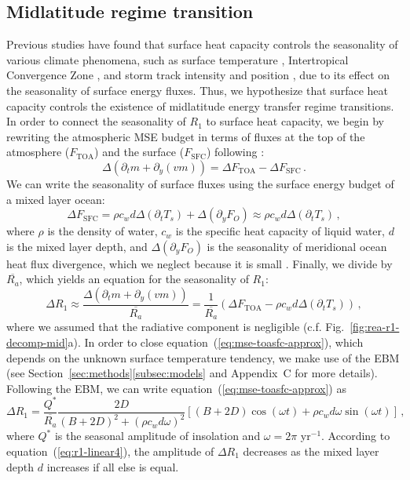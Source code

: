 \documentclass{ametsocV5}
\begin{document}
  \subsection{Midlatitude regime transition} \label{subsec:mld}
  Previous studies have found that surface heat capacity controls the seasonality of various climate phenomena, such as surface temperature \citep{donohoe2014}, Intertropical Convergence Zone \citep{bordoni2008}, and storm track intensity and position \citep{barpanda2020}, due to its effect on the seasonality of surface energy fluxes. Thus, we hypothesize that surface heat capacity controls the existence of midlatitude energy transfer regime transitions. In order to connect the seasonality of $R_1$ to surface heat capacity, we begin by rewriting the atmospheric MSE budget in terms of fluxes at the top of the atmosphere ($F_\mathrm{TOA}$) and the surface ($F_\mathrm{SFC}$) following \cite{barpanda2020}:
  \begin{equation}\label{eq:mse-toasfc}
    \Delta\left(\partial_t m + \partial_y (vm) \right) = \Delta F_{\mathrm{TOA}} - \Delta F_{\mathrm{SFC}} \, .
  \end{equation}
  We can write the seasonality of surface fluxes using the surface energy budget of a mixed layer ocean:
  \begin{equation}
    \Delta F_{\mathrm{SFC}} = \rho c_{w} d \Delta\left(\partial_t T_{s}\right) + \Delta ( \partial_y F_{O}) \approx \rho c_{w} d \Delta\left(\partial_t T_{s}\right) \, ,
  \end{equation}
  where $\rho$ is the density of water, $c_w$ is the specific heat capacity of liquid water, $d$ is the mixed layer depth, and $\Delta(\partial_y F_O)$ is the seasonality of meridional ocean heat flux divergence, which we neglect because it is small \citep{roberts2017}. Finally, we divide by $\overline{R_a}$, which yields an equation for the seasonality of $R_1$:
  \begin{equation}\label{eq:mse-toasfc-approx}
    \Delta R_1 \approx \frac{\Delta\left(\partial_t m + \partial_y (vm) \right)}{\overline{R_a}} = \frac{1}{\overline{R_a}} \left(\Delta F_{\mathrm{TOA}} - \rho c_{w} d \Delta\left(\partial_t T_{s}\right)\right) \, , 
  \end{equation}
  where we assumed that the radiative component is negligible (c.f. Fig.~\ref{fig:rea-r1-decomp-mid}a). In order to close equation~(\ref{eq:mse-toasfc-approx}), which depends on the unknown surface temperature tendency, we make use of the EBM (see Section~\ref{sec:methods}\ref{subsec:models} and Appendix~C for more details). Following the EBM, we can write equation~(\ref{eq:mse-toasfc-approx}) as
  \begin{equation} \label{eq:r1-linear4}
    \Delta R_{1} = \frac{Q^{*}}{\overline{R_{a}}}\frac{2D}{(B+2D)^{2}+(\rho c_w d \omega)^{2}}\left[(B+2D)\cos(\omega t)+\rho c_w d \omega \sin(\omega t)\right] \, ,
  \end{equation}
  where $Q^*$ is the seasonal amplitude of insolation and $\omega=2\pi$ yr$^{-1}$. According to equation~(\ref{eq:r1-linear4}), the amplitude of $\Delta R_1$ decreases as the mixed layer depth $d$ increases if all else is equal. 
\end{document}
